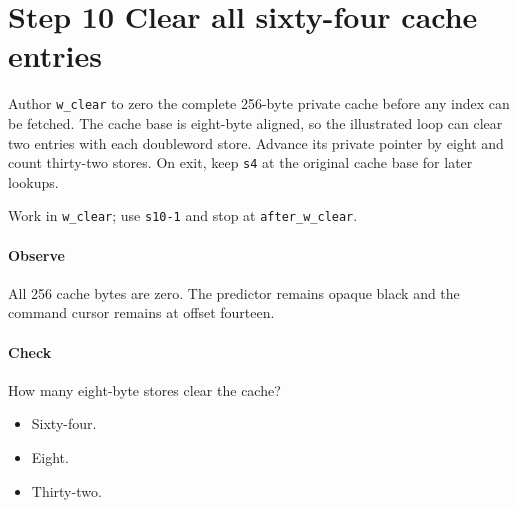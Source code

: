 \section{Step 10 Clear all sixty-four cache entries}\label{qoi-s10}
Author \texttt{w\_clear} to zero the complete 256-byte private cache before any index can be fetched. The cache base is eight-byte aligned, so the illustrated loop can clear two entries with each doubleword store. Advance its private pointer by eight and count thirty-two stores. On exit, keep \texttt{s4} at the original cache base for later lookups.

Work in \texttt{w\_clear}; use \texttt{s10-1} and stop at \texttt{after\_w\_clear}.

\paragraph{Observe} All 256 cache bytes are zero. The predictor remains opaque black and the command cursor remains at offset fourteen.

\paragraph{Check} How many eight-byte stores clear the cache?
\begin{itemize}
\item[A.] Sixty-four.
\item[B.] Eight.
\item[C.] Thirty-two.
\end{itemize}
